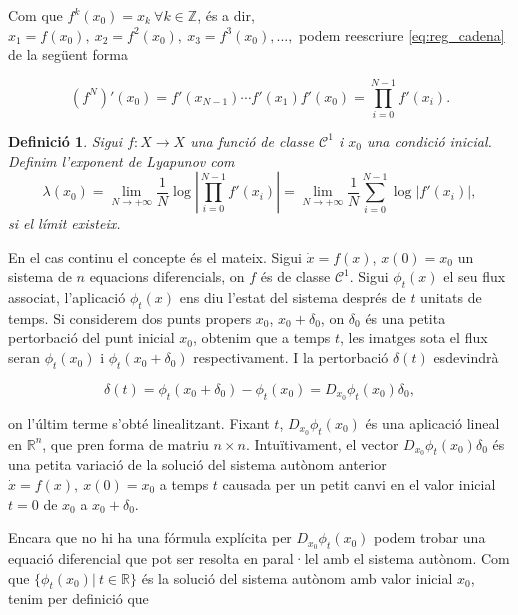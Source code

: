 \documentclass[11pt,a4paper,openright,oneside]{article}
\numberwithin{equation}{section}
\newtheorem{defi}[teo]{Definici\'o}
\theoremstyle{definition}
\begin{document}
Com que $f^k(x_0)=x_k \ \forall k\in\mathbb{Z}$, és a dir, $x_1=f(x_0),\ x_2=f^2(x_0), \ x_3=f^3(x_0),...,$ podem reescriure \eqref{eq:reg_cadena} de la següent forma

\begin{equation*}
    \left(f^N\right)'(x_0)=f'\left(x_{N-1}\right) \cdots f'(x_1)f'(x_0)=\prod_{i=0}^{N-1}f'(x_i).
    \end{equation*}

\begin{defi} \label{def:lyap}
    Sigui $f:X \rightarrow{X}$ una funció de classe $\mathcal{C}^1$ i $x_0$ una condició inicial. Definim l'exponent de Lyapunov com 
    \begin{equation*}
        \lambda(x_0) = \lim_{N \to +\infty} \frac{1}{N} \log \left\lvert \prod_{i=0}^{N-1}f'(x_i) \right\rvert = \lim_{N \to +\infty} \frac{1}{N} \sum_{i=0}^{N-1}\log\left\lvert f'(x_i)\right\rvert,
    \end{equation*}
    si el límit existeix.
\end{defi}

En el cas continu el concepte és el mateix. Sigui $\dot{x}=f(x)$, $x(0)=x_0$ un sistema de $n$ equacions diferencials, on $f$ és de classe $\mathcal{C}^1$. Sigui $\phi_t(x)$ el seu flux associat, l'aplicació $\phi_t(x)$ ens diu l'estat del sistema després de $t$ unitats de temps. Si considerem dos punts propers $x_0$, $x_0+\delta_0$, on $\delta_0$ és una petita pertorbació del punt inicial $x_0$, obtenim que a temps $t$, les imatges sota el flux seran $\phi_t(x_0)$ i $\phi_t(x_0+\delta_0)$ respectivament. I la pertorbació $\delta(t)$ esdevindrà 

\begin{equation*}
    \delta(t)=\phi_t(x_0+\delta_0)-\phi_t(x_0)=D_{x_0}\phi_t(x_0)\delta_0, 
\end{equation*}

on l'últim terme s'obté linealitzant. Fixant $t$, $D_{x_0}\phi_t(x_0)$ és una aplicació lineal en $\mathbb{R}^n$, que pren forma de matriu $n\times n$. Intuïtivament, el vector $D_{x_0}\phi_t(x_0)\delta_0$ és una petita variació de la solució del sistema autònom anterior $\dot{x}=f(x), \ x(0)=x_0$ a temps $t$ causada per un petit canvi en el valor inicial $t=0$ de $x_0$ a $x_0+\delta_0$.

Encara que no hi ha una fórmula explícita per $D_{x_0}\phi_t(x_0)$ podem trobar una equació diferencial que pot ser resolta en paral·lel amb el sistema autònom. Com que $\{\phi_t(x_0)|\ t\in\mathbb{R}\}$ és la solució del sistema autònom amb valor inicial $x_0$, tenim per definició que 
\end{document}

